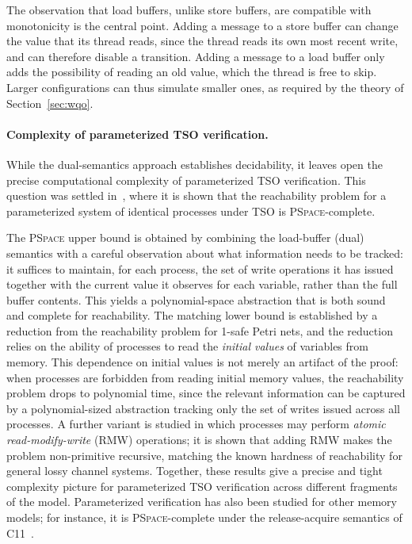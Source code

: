 The observation that load buffers, unlike store buffers, are compatible with
monotonicity is the central point. Adding a message to a store buffer can
change the value that its thread reads, since the thread reads its own most
recent write, and can therefore disable a transition. Adding a message to a
load buffer only adds the possibility of reading an old value, which the
thread is free to skip. Larger configurations can thus simulate smaller ones,
as required by the theory of Section~\ref{sec:wqo}.

\paragraph{Complexity of parameterized TSO verification.}
While the dual-semantics approach establishes decidability, it leaves open
the precise computational complexity of parameterized TSO verification. This
question was settled in~\cite{AAR20}, where it is shown that the reachability
problem for a parameterized system of identical processes under TSO is
\textsc{PSpace}-complete.

The \textsc{PSpace} upper bound is obtained by combining the load-buffer
(dual) semantics with a careful observation about what information needs to be
tracked: it suffices to maintain, for each process, the set of write
operations it has issued together with the current value it observes for each
variable, rather than the full buffer contents. This yields a polynomial-space
abstraction that is both sound and complete for reachability. The matching
lower bound is established by a reduction from the reachability problem for
1-safe Petri nets, and the reduction relies on the ability of
processes to read the \emph{initial values} of variables from memory. This
dependence on initial values is not merely an artifact of the proof: when
processes are forbidden from reading initial memory values, the reachability
problem drops to polynomial time, since the relevant information can be
captured by a polynomial-sized abstraction tracking only the set of writes
issued across all processes. A further variant is studied in which processes
may perform \emph{atomic read-modify-write} (RMW) operations; it is shown
that adding RMW makes the problem non-primitive recursive,
matching the known hardness of reachability for general lossy channel systems.
Together, these results give a precise and tight complexity picture for
parameterized TSO verification across different fragments of the model.
Parameterized verification has also been studied for other memory models; for
instance, it is \textsc{PSpace}-complete under the release-acquire semantics
of C11~\cite{KGMC22}.

